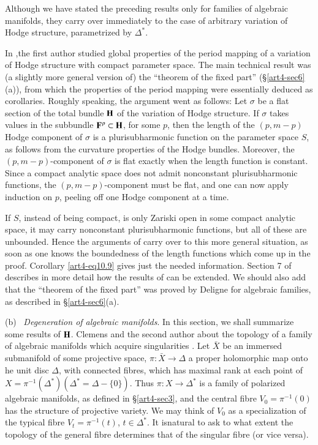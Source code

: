 \begin{remark*}
Although we have stated the preceding results only for families of algebraic manifolds, they carry over immediately to the case of arbitrary variation of Hodge structure, parametrized by $\Delta^\ast$.
\end{remark*}

In \cite{art4-key19},\pageoriginale  the first author studied global properties of the period mapping of a variation of Hodge structure with compact parameter space. The main technical result was (a slightly more general version of) the ``theorem of the fixed part'' (\cf \S \ref{art4-sec6}(a)), from which the properties of the period mapping were essentially deduced as corollaries. Roughly speaking, the argument went as follows: Let $\sigma$ be a flat section of the total bundle $\mathbf{H}$ of the variation of Hodge structure. If $\sigma$ takes values in the subbundle $\mathbf{F}^p \subset \mathbf{H}$, for some $p$, then the length of the $(p, m-p)$ Hodge component of $\sigma$ is a plurisubharmonic function on the parameter space $S$, as follows from the curvature properties of the Hodge bundles. Moreover, the $(p, m -p)$-component of $\sigma$ is flat exactly when the length function is constant. Since a compact analytic space does not admit nonconstant plurisubharmonic functions, the $(p, m -p)$-component must be flat, and one can now apply induction on $p$, peeling off one Hodge component at a time.

If $S$, instead of being compact, is only Zariski open in some compact analytic space, it may carry nonconstant plurisubharmonic functions, but all of these are unbounded. Hence the arguments of \cite{art4-key19} carry over to this more general situation, as soon as one knows the boundedness of the length functions which come up in the proof. Corollary \eqref{art4-eq10.9} gives just the needed information. Section 7 of \cite{art4-key41} describes in more detail how the results of \cite{art4-key19} can be extended. We should also add that the ``theorem of the fixed part'' was proved by Deligne for algebraic families, as described in \S\ref{art4-sec6}(a).

\noindent
(b)~ \textit{Degeneration of algebraic manifolds}. In this section, we shall summarize some results of $\mathbf{H}$. Clemens and the second author about the topology of a family of algebraic manifolds which acquire singularities \cite{art4-key10}. Let $\bar{X}$ be an immersed submanifold of some projective space, $\pi : \bar{X} \to \Delta$ a proper holomorphic map onto he unit disc $\Delta$, with connected fibres, which has maximal rank at each point of $X = \pi^{-1} (\Delta^\ast) (\Delta^\ast = \Delta - \{0\})$. Thus $\pi : X \to \Delta^\ast$ is a family of polarized algebraic manifolds, as defined in \S \ref{art4-sec3}, and the central fibre $V_0 = \pi^{-1} (0)$ has the structure of projective variety. We may think of $V_0$ as a specialization of the typical fibre $V_t = \pi^{-1} (t)$, $t \in \Delta^\ast$. It  is\pageoriginale natural to ask to what extent the topology of the general fibre determines that of the singular fibre (or vice versa).

